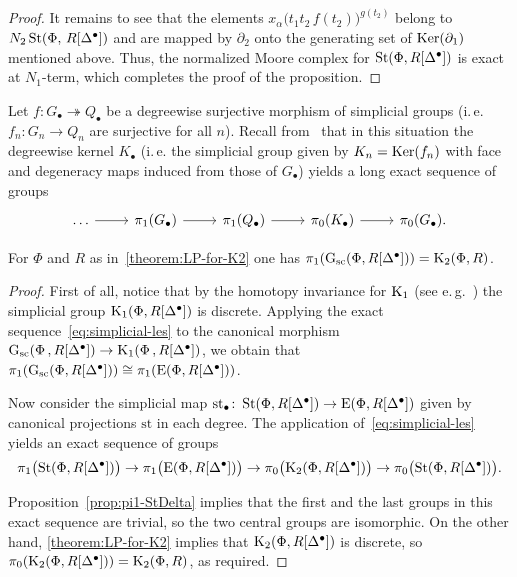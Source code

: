 \documentclass[oneside, 11pt]{amsart} \pdfoutput=1
\begin{document}
\begin{proof}
It remains to see that the elements $x_{\alpha}\big(t_1t_2\,f(t_2)\big)^{g(t_2)}$ belong to $N_2\mathop{\mathrm{St}}\nolimits(\Phi,\,R[\Delta^\bullet])$ and are mapped by $\partial_2$ onto the generating set of $\mathop{\mathrm{Ker}}\nolimits(\partial_1)$ mentioned above. Thus, the normalized Moore complex for $\mathop{\mathrm{St}}\nolimits(\Phi, R[\Delta^\bullet])$ is exact at $N_1$-term, which completes the proof of the proposition. \end{proof}

Let $f\colon G_\bullet\twoheadrightarrow Q_\bullet$ be a degreewise surjective morphism of simplicial groups (i.\,e. $f_n\colon G_n\to Q_n$ are surjective for all $n$). Recall from~\cite[Theorem~1.3]{Ina75} that in this situation the degreewise kernel $K_\bullet$ (i.\,e. the simplicial group given by $K_n = \mathop{\mathrm{Ker}}\nolimits(f_n)$ with face and degeneracy maps induced from those of $G_\bullet$) yields a long exact sequence of groups
\begin{equation} \label{eq:simplicial-les} \begin{tikzcd} \ldots \ar{r} & \pi_{1}(G_\bullet) \ar{r} & \pi_1(Q_\bullet) \ar{r} & \pi_0(K_\bullet) \ar{r} & \pi_0(G_\bullet). \end{tikzcd} \end{equation}

\begin{theorem} \label{theorem:pi1-GRDelta}
 For $\Phi$ and $R$ as in~\cref{theorem:LP-for-K2} one has $\pi_1(\mathrm{G}_\mathrm{sc}(\Phi, R[\Delta^\bullet])) = {\mathrm{K}}_2(\Phi, R)$.
\end{theorem}
\begin{proof}
First of all, notice that by the homotopy invariance for ${\mathrm{K}}_1$ (see e.\,g.~\cite[Theorem~1.3]{Sta14}) the simplicial group ${\mathrm{K}}_1(\Phi, R[\Delta^\bullet])$ is discrete. Applying the exact sequence~\eqref{eq:simplicial-les} to the canonical morphism $\mathrm{G}_\mathrm{sc}(\Phi\,,R[\Delta^\bullet]) \to {\mathrm{K}}_1(\Phi\,,R[\Delta^\bullet])$, we obtain that $\pi_1(\mathrm{G}_\mathrm{sc}(\Phi, R[\Delta^\bullet])) \cong \pi_1(\mathrm{E}(\Phi, R[\Delta^\bullet]))$.
 
Now consider the simplicial map $\mathrm{st}_\bullet \colon \mathop{\mathrm{St}}\nolimits(\Phi, R[\Delta^\bullet]) \to \mathrm{E}(\Phi, R[\Delta^\bullet])$ given by canonical projections $\mathrm{st}$ in each degree. The application of~\eqref{eq:simplicial-les} yields an exact sequence of groups
\[
\pi_1\bigl(\mathop{\mathrm{St}}\nolimits(\Phi, R[\Delta^\bullet])\bigr) \to \pi_1\bigl(\mathrm{E}(\Phi, R[\Delta^\bullet])\bigr) \to \pi_0\bigl({\mathrm{K}}_2(\Phi, R[\Delta^\bullet])\bigr) \to \pi_0\bigl(\mathop{\mathrm{St}}\nolimits(\Phi, R[\Delta^\bullet])\bigr).
\]
\iffalse \[
\begin{tikzcd} \pi_1(\St(\Phi, R[\Delta^\bullet])) \ar[r] & \pi_1(\E(\Phi, R[\Delta^\bullet])) \ar[r] & \pi_0(\K_2(\Phi, R[\Delta^\bullet])) \ar[r] & \pi_0(\St(\Phi, R[\Delta^\bullet])). \end{tikzcd}
\] \fi
 Proposition~\ref{prop:pi1-StDelta} implies that the first and the last groups in this exact sequence are trivial, so the two central groups are isomorphic. On the other hand, \cref{theorem:LP-for-K2} implies that ${\mathrm{K}}_2(\Phi, R[\Delta^\bullet])$ is discrete, so $\pi_0({\mathrm{K}}_2(\Phi, R[\Delta^\bullet])) = {\mathrm{K}}_2(\Phi, R)$, as required.
\end{proof}
\end{document}
